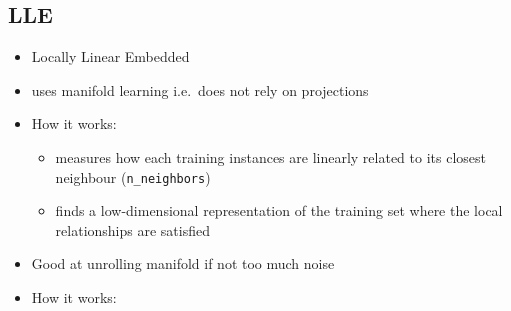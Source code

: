 \subsection{LLE}
\begin{itemize}
    \item Locally Linear Embedded
    \item uses manifold learning i.e.\ does not rely on projections
    \item How it works:
    \begin{itemize}
        \item measures how each training instances are linearly related to its closest neighbour (\verb;n_neighbors;)
        \item finds a low-dimensional representation of the training set where the local relationships are satisfied
    \end{itemize}
    \item Good at unrolling manifold if not too much noise
    \item How it works:
\end{itemize}

